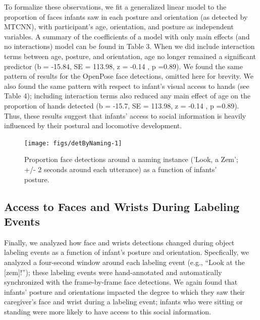 \documentclass[10pt, letterpaper]{article}
\newenvironment{CodeChunk}{}{}
\begin{document}
To formalize these observations, we fit a generalized linear model to
the proportion of faces infants saw in each posture and orientation (as
detected by MTCNN), with participant's age, orientation, and posture as
independent variables. A summary of the coefficients of a model with
only main effects (and no interactions) model can be found in Table 3.
When we did include interaction terms between age, posture, and
orientation, age no longer remained a significant predictor (b = -15.84,
SE = 113.98, z = -0.14 , p =0.89). We found the same pattern of results
for the OpenPose face detections, omitted here for brevity. We also
found the same pattern with respect to infant's visual access to hands
(see Table 4); including interaction terms also reduced any main effect
of age on the proportion of hands detected (b = -15.7, SE = 113.98, z =
-0.14 , p =0.89). Thus, these results suggest that infants' access to
social information is heavily influenced by their postural and
locomotive development.

\begin{CodeChunk}
\begin{figure}[H]

{\centering \texttt{[image: figs/detByNaming-1]} 

}

\caption[Proportion face detections around a naming instance ('Look, a Zem']{Proportion face detections around a naming instance ('Look, a Zem'; +/- 2 seconds around each utterance) as a function of infants' posture.}\label{fig:detByNaming}
\end{figure}
\end{CodeChunk}

\subsection{Access to Faces and Wrists During Labeling
Events}\label{access-to-faces-and-wrists-during-labeling-events}

Finally, we analyzed how face and wrists detections changed during
object labeling events as a function of infant's posture and
orientation. Specfically, we analyzed a four-second window around each
labeling event (e.g., ``Look at the {[}zem{]}!''); these labeling events
were hand-annotated and automatically synchronized with the
frame-by-frame face detections. We again found that infants' posture and
orientations impacted the degree to which they saw their caregiver's
face and wrist during a labeling event; infants who were sitting or
standing were more likely to have access to this social information.
\end{document}
